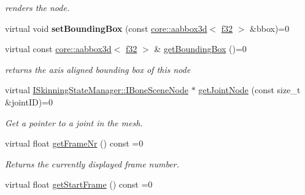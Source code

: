 \begin{DoxyCompactItemize}
\begin{DoxyCompactList}\small\item\em renders the node. \end{DoxyCompactList}\item 
virtual void {\bfseries set\+Bounding\+Box} (const \hyperlink{classirr_1_1core_1_1aabbox3d}{core\+::aabbox3d}$<$ \hyperlink{namespaceirr_a0277be98d67dc26ff93b1a6a1d086b07}{f32} $>$ \&bbox)=0\hypertarget{classirr_1_1scene_1_1ISkinnedMeshSceneNode_ae257040dfca5c8f91d6c138d61aa49f7}{}\label{classirr_1_1scene_1_1ISkinnedMeshSceneNode_ae257040dfca5c8f91d6c138d61aa49f7}

\item 
virtual const \hyperlink{classirr_1_1core_1_1aabbox3d}{core\+::aabbox3d}$<$ \hyperlink{namespaceirr_a0277be98d67dc26ff93b1a6a1d086b07}{f32} $>$ \& \hyperlink{classirr_1_1scene_1_1ISkinnedMeshSceneNode_a5a5613c75cc0ed13151f73cdea0a241d}{get\+Bounding\+Box} ()=0\hypertarget{classirr_1_1scene_1_1ISkinnedMeshSceneNode_a5a5613c75cc0ed13151f73cdea0a241d}{}\label{classirr_1_1scene_1_1ISkinnedMeshSceneNode_a5a5613c75cc0ed13151f73cdea0a241d}

\begin{DoxyCompactList}\small\item\em returns the axis aligned bounding box of this node \end{DoxyCompactList}\item 
virtual \hyperlink{classirr_1_1scene_1_1ISkinningStateManager_1_1IBoneSceneNode}{I\+Skinning\+State\+Manager\+::\+I\+Bone\+Scene\+Node} $\ast$ \hyperlink{classirr_1_1scene_1_1ISkinnedMeshSceneNode_a9bdebc409416a8dc972046b94517e294}{get\+Joint\+Node} (const size\+\_\+t \&joint\+ID)=0
\begin{DoxyCompactList}\small\item\em Get a pointer to a joint in the mesh. \end{DoxyCompactList}\item 
virtual float \hyperlink{classirr_1_1scene_1_1ISkinnedMeshSceneNode_a6c4220f9aee4e02cfe983895dd3176ad}{get\+Frame\+Nr} () const  =0\hypertarget{classirr_1_1scene_1_1ISkinnedMeshSceneNode_a6c4220f9aee4e02cfe983895dd3176ad}{}\label{classirr_1_1scene_1_1ISkinnedMeshSceneNode_a6c4220f9aee4e02cfe983895dd3176ad}

\begin{DoxyCompactList}\small\item\em Returns the currently displayed frame number. \end{DoxyCompactList}\item 
virtual float \hyperlink{classirr_1_1scene_1_1ISkinnedMeshSceneNode_a21292043e2ad53e737db5efcc88dd8bf}{get\+Start\+Frame} () const  =0\hypertarget{classirr_1_1scene_1_1ISkinnedMeshSceneNode_a21292043e2ad53e737db5efcc88dd8bf}{}\label{classirr_1_1scene_1_1ISkinnedMeshSceneNode_a21292043e2ad53e737db5efcc88dd8bf}


\end{DoxyCompactItemize}
